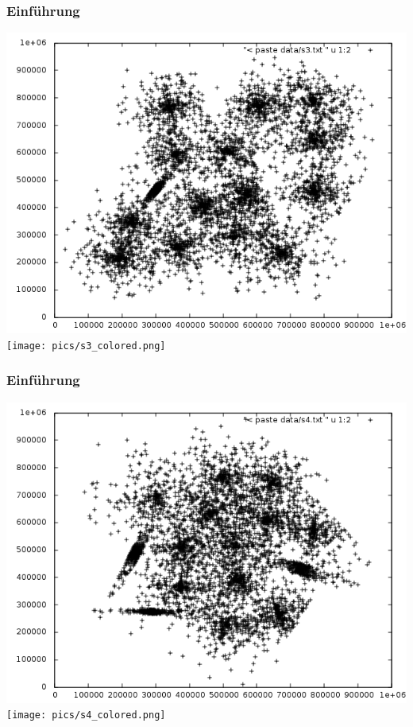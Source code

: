\documentclass[10pt]{beamer}
\begin{document}
\begin{frame}
	\frametitle{Einf\"uhrung}
	\includegraphics[scale=0.34, keepaspectratio]{pics/s3_black.png}
	\texttt{[image: pics/s3\_colored.png]}
\end{frame}
\begin{frame}
	\frametitle{Einf\"uhrung}
	\includegraphics[scale=0.34, keepaspectratio]{pics/s4_black.png}
	\texttt{[image: pics/s4\_colored.png]}
\end{frame}
\end{document}
